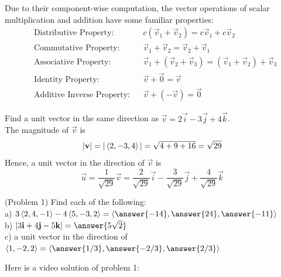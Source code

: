 \documentclass[handout]{ximera}
\begin{document}
Due to their component-wise computation, the vector operations of scalar multiplication and addition have some familiar properties:
\begin{align*}
&\text{Distributive Property:} & &c(\vec{v}_1 + \vec{v}_2) = c\vec{v}_1 + c\vec{v}_2   \\
& \text{Commutative Property:}& &\vec{v}_1 + \vec{v}_2 = \vec{v}_2 + \vec{v}_1 \\
& \text{Associative Property:}&  &\vec{v}_1 + (\vec{v}_2+ \vec{v}_3) =  (\vec{v}_1 + \vec{v}_2) + \vec{v}_3 \\
&\text{Identity Property:} & &\vec{v} + \vec{0} = \vec{v} \\
& \text{Additive Inverse Property:} & &\vec{v} + (-\vec{v}) = \vec{0} 
\end{align*}

\begin{example}[Example 1]
Find a unit vector in the same direction as $\vec{v} = 2 \vec{i} - 3\vec{j} + 4\vec{k}$.\\
The magnitude of $\vec{v}$ is
\[
|\mathbf{v}| = |\left\langle 2, -3, 4\right\rangle| = \sqrt{4+9+16} = \sqrt{29}
\]
Hence, a unit vector in the direction of $\vec{v}$ is
\[
\vec{u} = \frac{1}{\sqrt{29}}\vec{v} = \frac{2}{\sqrt{29}}\vec{i} - \frac{3}{\sqrt{29}}\vec{j} + \frac{4}{\sqrt{29}}\vec{k}
\]
\end{example}

\begin{problem}(Problem 1)
Find each of the following:\\
a) $3\vector{2, 4, -1} - 4\vector{5, -3, 2} = \vector{\answer{-14}, \answer{24}, \answer{-11}}$\\
b) $|3\vec{i} + 4\vec{j}- 5\vec{k}| = \answer{5\sqrt{2}}$\\
c) a unit vector in the direction of $\vector{1, -2, 2} = \vector{\answer{1/3}, \answer{-2/3}, \answer{2/3}}$
\end{problem}

Here is a video solution of problem 1:\\
\begin{foldable}
\end{foldable}
\end{document}
